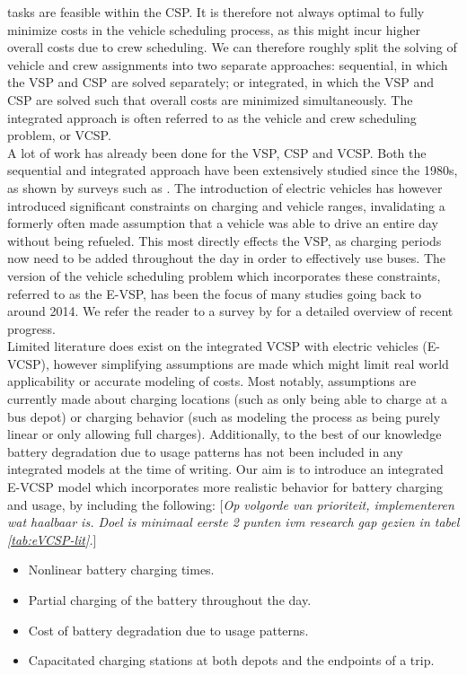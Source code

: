 \documentclass[]{article}
\newcommand{\todonocomment}[1]{{\color{red}[\textit{#1}]}}
\begin{document}
tasks are feasible within the CSP. It is therefore not always optimal to
fully minimize costs in the vehicle scheduling process, as this might incur
higher overall costs due to crew scheduling. We can therefore roughly split the
solving of vehicle and crew assignments into two separate approaches:
sequential, in which the VSP and CSP are solved separately; or integrated, in
which the VSP and CSP are solved such that overall costs are minimized
simultaneously. The integrated approach is often referred to as the vehicle and
crew scheduling problem, or VCSP. \\
A lot of work has already been done for the VSP, CSP and VCSP.
Both the sequential and integrated approach have been extensively studied since the 1980s, as shown by surveys such as \citet{Bodin1983}. The introduction of electric vehicles has however introduced significant constraints on charging and vehicle ranges, invalidating a formerly often made assumption that a vehicle was able to drive an entire day without being refueled. This most directly effects the VSP, as charging periods now need to be added throughout the day in order to
effectively use buses. The version of the vehicle scheduling problem which incorporates these constraints, referred to as the
E-VSP, has been the focus of many studies going back to around 2014. We refer the reader
to a survey by \citet{Perumal2022LitRev} for a detailed overview of recent progress. \\
Limited literature does exist on the integrated VCSP with electric vehicles (E-VCSP), however
simplifying assumptions are made which might limit real world applicability or
accurate modeling of costs. Most notably, assumptions are currently made about charging
locations (such as only being able to charge at a bus depot) or charging
behavior (such as modeling the process as being purely linear or only allowing
full charges). Additionally, to the best of our knowledge battery degradation
due to usage patterns has not been included in any integrated models at the
time of writing. Our aim is to introduce an integrated E-VCSP model which incorporates more realistic behavior for battery charging and usage, by including the following: \todonocomment{Op volgorde van prioriteit, implementeren wat haalbaar is. Doel is minimaal eerste 2 punten ivm research gap gezien in tabel \ref{tab:eVCSP-lit}.}
\begin{itemize}
  \item Nonlinear battery charging times.
  \item Partial charging of the battery throughout the day.
  \item Cost of battery degradation due to usage patterns.
  \item Capacitated charging stations at both depots and the endpoints of a trip.
\end{itemize}
\end{document}
